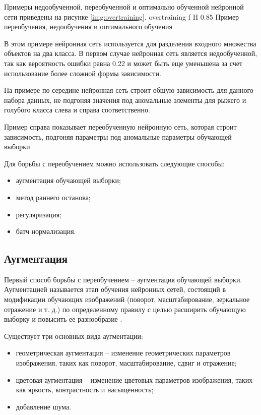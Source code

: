 Примеры недообученной, переобученной и оптимально обученной нейронной сети приведены на рисунке \ref{img:overtraining}.
{overtraining} %
{f} %
{H} %
{0.85\textwidth} %
{Пример переобучения, недообучения и оптимального обучения} %

В этом примере нейронная сеть используется для разделения входного множества объектов на два класса. В первом случае нейронная сеть является недообученной, так как вероятность ошибки равна 0.22 и может быть еще уменьшена за счет использование более сложной формы зависимости.

На примере по середине нейронная сеть строит общую зависимость для данного набора данных, не подгоняя значения под аномальные элементы для рыжего и голубого класса слева и справа соответственно.

Пример справа показывает переобученную нейронную сеть, которая строит зависимость, подгоняя параметры под аномальные параметры обучающей выборки.

Для борьбы с переобучением можно использовать следующие способы:
\begin{itemize}
	\item аугментация обучающей выборки;
	\item метод раннего останова;
	\item регуляризация;
	\item батч нормализация.
\end{itemize}

\subsection{Аугментация}
Первый способ борьбы с переобучением -- аугментация обучающей выборки. Аугментацией называется этап обучения нейронных сетей, состоящий в модификации обучающих изображений (поворот, масштабирование, зеркальное отражение и т. д.) по определенному правилу с целью расширить обучающую выборку и повысить ее разнообразие \cite{augmentation}.

Существует три основных вида аугментации:
\begin{itemize}
	\item геометрическая аугментация -- изменение геометрических параметров изображения, таких как поворот, масштабирование, сдвиг и отражение;
	\item цветовая аугментация -- изменение цветовых параметров изображения, таких как яркость, контрастность и насыщенность;
	\item добавление шума.
\end{itemize}


